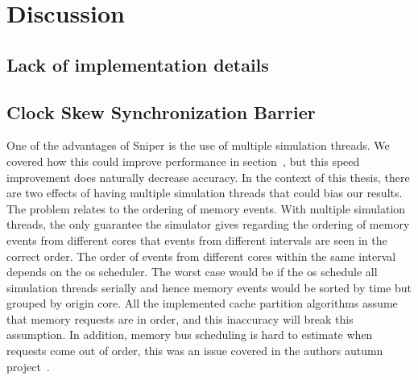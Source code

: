 
\chapter{Discussion}
\label{cpt:discussion}



\section{Lack of implementation details}



\section{Clock Skew Synchronization Barrier}

One of the advantages of Sniper is the use of multiple simulation threads\cite{Carlson2011a}.
We covered how this could improve performance in section~, but this speed improvement does naturally decrease accuracy.
In the context of this thesis, there are two effects of having multiple
simulation threads that could bias our results.
The problem relates to the ordering of memory events.
With multiple simulation threads, the only guarantee the simulator gives regarding the ordering of memory events from different cores that events from different intervals are seen in the correct order.
The order of events from different cores within the same interval depends on the os scheduler.
The worst case would be if the os schedule all simulation threads serially and hence memory events would be sorted by time but grouped by origin core.
All the implemented cache partition algorithms assume that memory requests are in order, and this inaccuracy will break this assumption.
In addition, memory bus scheduling is hard to estimate when requests come out of order, this was an issue covered in the authors autumn project~\cite{Olsen2014}.

